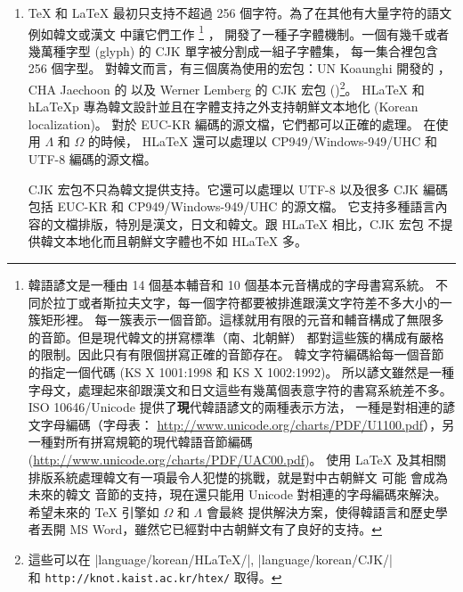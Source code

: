 \begin{enumerate}
\item
\TeX{} 和 \LaTeX{} 最初只支持不超過 256 個字符。為了在其他有大量字符的語文例如韓文或漢文
中讓它們工作
 \footnote{韓語諺文是一種由 14 個基本輔音和 10 個基本元音構成的字母書寫系統。
 不同於拉丁或者斯拉夫文字，每一個字符都要被排進跟漢文字符差不多大小的一簇矩形裡。
每一簇表示一個音節。這樣就用有限的元音和輔音構成了無限多的音節。但是現代韓文的拼寫標準（南、北朝鮮）
都對這些簇的構成有嚴格的限制。因此只有有限個拼寫正確的音節存在。
韓文字符編碼給每一個音節的指定一個代碼 (KS X 1001:1998 和 KS X 1002:1992)。
所以諺文雖然是一種字母文，處理起來卻跟漢文和日文這些有幾萬個表意字符的書寫系統差不多。
ISO 10646/Unicode 提供了{\textbf 現代}韓語諺文的兩種表示方法，
一種是對相連的諺文字母編碼（字母表：
\url{http://www.unicode.org/charts/PDF/U1100.pdf}），另一種對所有拼寫規範的現代韓語音節編碼 (\url{http://www.unicode.org/charts/PDF/UAC00.pdf})。
 使用 \LaTeX{} 及其相關排版系統處理韓文有一項最令人犯憷的挑戰，就是對中古朝鮮文 \pozhehao 可能
 會成為未來的韓文 \pozhehao 音節的支持，現在還只能用 Unicode 對相連的字母編碼來解決。希望未來的 \TeX{} 引擎如 $\Omega$ 和 $\Lambda$ 會最終
 提供解決方案，使得韓語言和歷史學者丟開 MS Word，雖然它已經對中古朝鮮文有了良好的支持。}
，
開發了一種子字體機制。一個有幾千或者幾萬種字型 (glyph) 的 CJK 單字被分割成一組子字體集，
每一集合裡包含 256 個字型。
對韓文而言，有三個廣為使用的宏包：UN Koaunghi 開發的 ，
CHA Jaechoon 的  以及 Werner Lemberg 的 CJK 宏包 ()\footnote{%
這些可以在 \CTANref|language/korean/HLaTeX/|, \CTANref|language/korean/CJK/|\\
和 \texttt{http://knot.kaist.ac.kr/htex/} 取得。}。
H\LaTeX{} 和 h\LaTeX{}p 專為韓文設計並且在字體支持之外支持朝鮮文本地化 (Korean
localization)。 對於 EUC-KR 編碼的源文檔，它們都可以正確的處理。
在使用 $\Lambda$ 和 $\Omega$ 的時候，
H\LaTeX{} 還可以處理以 CP949/Windows-949/UHC 和 UTF-8 編碼的源文檔。

CJK 宏包不只為韓文提供支持。它還可以處理以 UTF-8 以及很多 CJK 編碼包括 EUC-KR 和 
CP949/Windows-949/UHC 的源文檔。
它支持多種語言內容的文檔排版，特別是漢文，日文和韓文。跟 H\LaTeX{} 相比，CJK 宏包
不提供韓文本地化而且朝鮮文字體也不如 H\LaTeX{} 多。


\end{enumerate}

